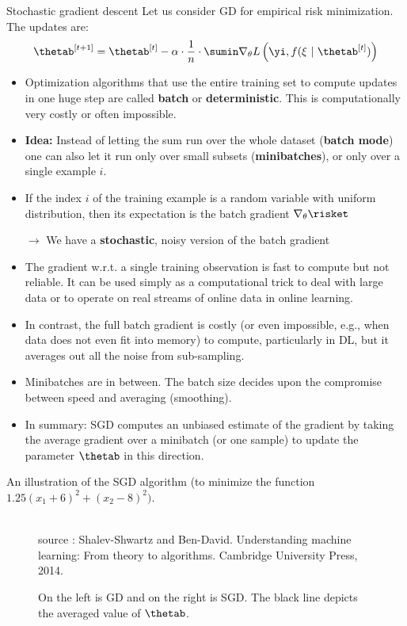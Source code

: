\documentclass[11pt,compress,t,notes=noshow]{beamer}
\newenvironment{vbframe}  %
{
 \begin{frame}[containsverbatim,allowframebreaks]
}
{
\end{frame}
}
\begin{document}
\begin{vbframe}{Stochastic gradient descent}
Let us consider GD for empirical risk minimization. The updates are: 
$$\thetab^{[t + 1]} = \thetab^{[t]} - \alpha \cdot \frac{1}{n} \cdot \sumin \nabla_\theta L\left(\yi, f(\xi ~|~ \thetab^{[t]})\right)$$
\begin{itemize}
\item Optimization algorithms that use the entire training set to compute updates in one huge step are called \textbf{batch} or \textbf{deterministic}. This is computationally very costly or often impossible. 
\item \textbf{Idea:} Instead of letting the sum run over the whole dataset (\textbf{batch mode}) one can also let it run only over small subsets (\textbf{minibatches}), or only over a single example $i$. 
\item If the index $i$ of the training example is a random variable with uniform distribution, then its expectation is the batch gradient $\nabla_\theta \risket$
\item[$\to$] We have a \textbf{stochastic}, noisy version of the batch gradient
\framebreak 

\item The gradient w.r.t. a single training observation is fast to compute but not reliable. It can be used simply as a computational trick to deal with large data or to operate on real streams of online data in online learning.
\item In contrast, the full batch gradient is costly (or even impossible, e.g., when data does not even fit into memory) to compute, particularly in DL, but it averages out all the noise from sub-sampling.
\item Minibatches are in between. The batch size decides upon the compromise between speed and averaging (smoothing).
\item In summary: SGD computes an unbiased estimate of the gradient by taking the average gradient over a minibatch (or one sample) to update the parameter $\thetab$ in this direction.
\end{itemize}
\framebreak
 
An illustration of the SGD algorithm (to minimize the function $1.25(x_1 + 6)^2 + (x_2 - 8)^2)$.
\begin{figure}
\tiny{\\ source : Shalev-Shwartz and  Ben-David.
Understanding machine learning: From theory to algorithms. Cambridge University Press, 2014. }
\caption{On the left is GD and on the right is SGD. The black line depicts the averaged value of $\thetab$.}
\end{figure}
\framebreak


\end{vbframe}
\end{document}
